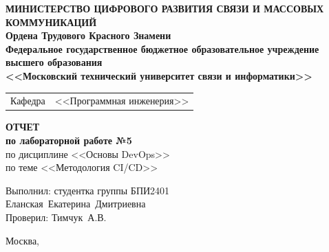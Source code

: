 \thispagestyle{empty}

\begin{center}
	\textbf{МИНИСТЕРСТВО ЦИФРОВОГО РАЗВИТИЯ СВЯЗИ И МАССОВЫХ КОММУНИКАЦИЙ} \\
	\textbf{Ордена Трудового Красного Знамени \\
	Федеральное государственное бюджетное образовательное учреждение высшего образования \\
	<<Московский технический университет связи и информатики>>}
\end{center}

\vspace{0.3em}

\begin{center}
	\begin{tabularx}{0.5\textwidth}{p{1.2cm}X}
		Кафедра & \quad <<Программная инженерия>> \\%
	\end{tabularx}
\end{center}

\vspace{12em}

\begin{center}
	\Large
	\textbf{ОТЧЕТ} \\
	\textbf{по лабораторной работе №5} \\
	\large
	по дисциплине <<Основы DevOps>> \\
	по теме <<Методология CI/CD>>
\end{center}


\vspace{3em}

\begin{flushright}
	Выполнил: 
	студентка группы БПИ2401 \\
	Еланская~Екатерина~Дмитриевна\\
	Проверил: Тимчук~А.В.\\
\end{flushright}

\vspace{8em}

\begin{center}
	Москва,~\the\year
\end{center}
\clearpage


